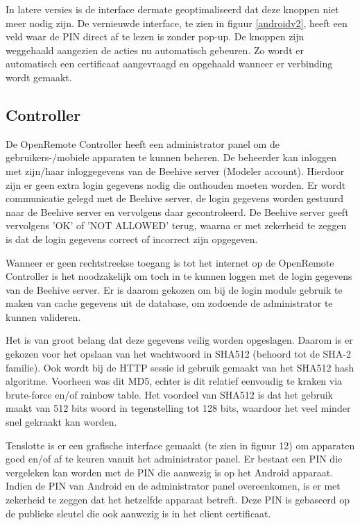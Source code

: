 \documentclass[]{article}
\begin{document}
In latere versies is de interface dermate geoptimaliseerd dat deze knoppen niet
meer nodig zijn. De vernieuwde interface, te zien in figuur \ref{androidv2}, heeft een
veld waar de PIN direct af te lezen is zonder pop-up. De knoppen zijn weggehaald
aangezien de acties nu automatisch gebeuren. Zo wordt er automatisch een
certificaat aangevraagd en opgehaald wanneer er verbinding wordt gemaakt. 

\subsection{Controller}
De OpenRemote Controller heeft een administrator panel om de gebruikers-/mobiele
apparaten te kunnen beheren. De beheerder kan inloggen met zijn/haar
inloggegevens van de Beehive server (Modeler account). Hierdoor zijn er geen
extra login gegevens nodig die onthouden moeten worden. Er wordt communicatie
gelegd met de Beehive server, de login gegevens worden gestuurd naar de Beehive server
en vervolgens daar gecontroleerd. De Beehive server geeft vervolgens 'OK'
of 'NOT ALLOWED' terug, waarna er met zekerheid te zeggen is dat de login gegevens
correct of incorrect zijn opgegeven.

Wanneer er geen rechtstreekse toegang is tot het internet op de 
OpenRemote Controller is het noodzakelijk om toch in te kunnen loggen met de
login gegevens van de Beehive server. Er is daarom gekozen om bij de login module
gebruik te maken van cache gegevens uit de database, om zodoende de administrator te
kunnen valideren.

Het is van groot belang dat deze gegevens veilig worden opgeslagen. Daarom is er
gekozen voor het opslaan van het wachtwoord in SHA512 (behoord tot de SHA-2
familie). Ook wordt bij de HTTP sessie id gebruik gemaakt van het SHA512
hash algoritme. Voorheen was dit MD5, echter is dit relatief
eenvoudig te kraken via brute-force en/of rainbow table. Het voordeel van SHA512
is dat het gebruik maakt van 512 bits woord in tegenstelling tot 128
bits, waardoor het veel minder snel gekraakt kan worden.

Tenslotte is er een grafische interface gemaakt (te zien in figuur 12) om
apparaten goed en/of af te keuren vanuit het administrator panel. Er bestaat
een PIN die vergeleken kan worden met de PIN die aanwezig is op het Android
apparaat. Indien de PIN van Android en de administrator panel overeenkomen, is
er met zekerheid te zeggen dat het hetzelfde apparaat betreft. Deze PIN is
gebaseerd op de publieke sleutel die ook aanwezig is in het client certificaat.
\end{document}
